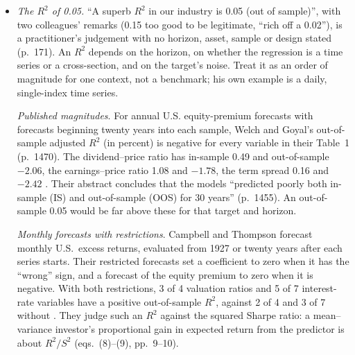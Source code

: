\begin{qfmethod}
\begin{itemize}
\emph{Block length}. The authors of the method later corrected the automatic block-length rule of Politis and White (2004): after Nordman (2008) found an error in Lahiri's variance calculation for the stationary bootstrap, the variance constant becomes $D_{SB}=2g^2(0)$, the circular block bootstrap's optimal mean-squared error is $(2/3)^{2/3}\approx0.763$ of the stationary bootstrap's, and the earlier simulation tables are replaced; with the correction the estimated block sizes average 90 to 110 percent of the optimal ones in their AR(1) designs \citep[secs.~1--2, pp.~372--373]{patton-politis-white-2009}. That bears on choosing $b$ for a mean; whether the same choice suits path statistics such as the maximum drawdown is not addressed there.
\item \emph{The $R^2$ of 0.05.} ``A superb $R^2$ in our industry is 0.05 (out of sample)'', with two colleagues' remarks (0.15 too good to be legitimate, ``rich off a 0.02''), is a practitioner's judgement with no horizon, asset, sample or design stated (p.~171). An $R^2$ depends on the horizon, on whether the regression is a time series or a cross-section, and on the target's noise. Treat it as an order of magnitude for one context, not a benchmark; his own example is a daily, single-index time series.

\emph{Published magnitudes}. For annual U.S. equity-premium forecasts with forecasts beginning twenty years into each sample, Welch and Goyal's out-of-sample adjusted $R^2$ (in percent) is negative for every variable in their Table~1 (p.~1470). The dividend--price ratio has in-sample 0.49 and out-of-sample $-2.06$, the earnings--price ratio 1.08 and $-1.78$, the term spread 0.16 and $-2.42$ \citep[Table~1]{s7-welch}. Their abstract concludes that the models ``predicted poorly both in-sample (IS) and out-of-sample (OOS) for 30 years'' (p.~1455). An out-of-sample 0.05 would be far above these for that target and horizon.

\emph{Monthly forecasts with restrictions}. Campbell and Thompson forecast monthly U.S.\ excess returns, evaluated from 1927 or twenty years after each series starts. Their restricted forecasts set a coefficient to zero when it has the ``wrong'' sign, and a forecast of the equity premium to zero when it is negative. With both restrictions, 3 of 4 valuation ratios and 5 of 7 interest-rate variables have a positive out-of-sample $R^2$, against 2 of 4 and 3 of 7 without \citep[Table~1, panels A--D, pp.~6--7]{campbell-thompson-2005-nber}. They judge such an $R^2$ against the squared Sharpe ratio: a mean--variance investor's proportional gain in expected return from the predictor is about $R^2/S^2$ (eqs.~(8)--(9), pp.~9--10).


\end{itemize}
\end{qfmethod}
